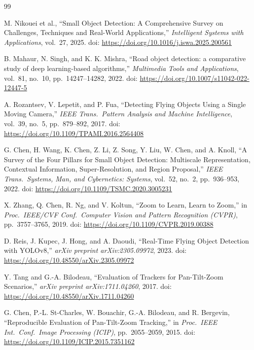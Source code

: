 \documentclass[conf]{new-aiaa}
\begin{document}
\newpage
\begin{thebibliography}{99}

M. Nikouei et al., ``Small Object Detection: A Comprehensive Survey on Challenges, Techniques and Real-World Applications,'' \textit{Intelligent Systems with Applications}, vol.\ 27, 2025. doi: \url{https://doi.org/10.1016/j.iswa.2025.200561}

B. Mahaur, N. Singh, and K. K. Mishra, ``Road object detection: a comparative study of deep learning-based algorithms,'' \textit{Multimedia Tools and Applications}, vol.\ 81, no.\ 10, pp.\ 14247--14282, 2022. doi: \url{https://doi.org/10.1007/s11042-022-12447-5}

A. Rozantsev, V. Lepetit, and P. Fua, ``Detecting Flying Objects Using a Single Moving Camera,'' \textit{IEEE Trans.\ Pattern Analysis and Machine Intelligence}, vol.\ 39, no.\ 5, pp.\ 879--892, 2017. doi: \url{https://doi.org/10.1109/TPAMI.2016.2564408}

G. Chen, H. Wang, K. Chen, Z. Li, Z. Song, Y. Liu, W. Chen, and A. Knoll, ``A Survey of the Four Pillars for Small Object Detection: Multiscale Representation, Contextual Information, Super-Resolution, and Region Proposal,'' \textit{IEEE Trans.\ Systems, Man, and Cybernetics: Systems}, vol.\ 52, no.\ 2, pp.\ 936--953, 2022. doi: \url{https://doi.org/10.1109/TSMC.2020.3005231}

X. Zhang, Q. Chen, R. Ng, and V. Koltun, ``Zoom to Learn, Learn to Zoom,'' in \textit{Proc.\ IEEE/CVF Conf.\ Computer Vision and Pattern Recognition (CVPR)}, pp.\ 3757--3765, 2019. doi: \url{https://doi.org/10.1109/CVPR.2019.00388}

D. Reis, J. Kupec, J. Hong, and A. Daoudi, ``Real-Time Flying Object Detection with YOLOv8,'' \textit{arXiv preprint arXiv:2305.09972}, 2023. doi: \url{https://doi.org/10.48550/arXiv.2305.09972}

Y. Tang and G.-A. Bilodeau, ``Evaluation of Trackers for Pan-Tilt-Zoom Scenarios,'' \textit{arXiv preprint arXiv:1711.04260}, 2017. doi: \url{https://doi.org/10.48550/arXiv.1711.04260}

G. Chen, P.-L. St-Charles, W. Bouachir, G.-A. Bilodeau, and R. Bergevin, ``Reproducible Evaluation of Pan-Tilt-Zoom Tracking,'' in \textit{Proc.\ IEEE Int.\ Conf.\ Image Processing (ICIP)}, pp.\ 2055--2059, 2015. doi: \url{https://doi.org/10.1109/ICIP.2015.7351162}


\end{thebibliography}
\end{document}

